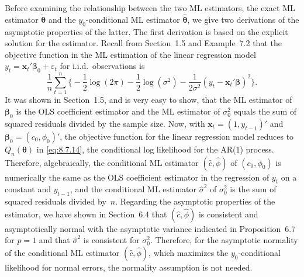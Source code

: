 Before examining the relationship between the two ML estimators, the exact
ML estimator $\tilde{\boldsymbol{\theta}}$ and the $y_0$-conditional ML estimator $\hat{\boldsymbol{\theta}}$, we give two derivations of
the asymptotic properties of the latter. The first derivation is based on the explicit
solution for the estimator. Recall from Section~1.5 and Example~7.2 that the objective function in the ML estimation of the linear regression model $y_t = \mathbf{x}_t'\boldsymbol{\beta}_0 + \varepsilon_t$
for i.i.d.\ observations is
\begin{equation}
  \frac{1}{n}\sum_{t=1}^{n}
    \biggl\{-\frac{1}{2}\log(2\pi) - \frac{1}{2}\log(\sigma^2)
    - \frac{1}{2\sigma^2}(y_t - \mathbf{x}_t'\boldsymbol{\beta})^2\biggr\}.
  \label{eq:8.7.16} \tag{8.7.16}
\end{equation}
It was shown in Section~1.5, and is very easy to show, that the ML estimator of
$\boldsymbol{\beta}_0$ is the OLS coefficient estimator and the ML estimator of $\sigma_0^2$ equals the sum
of squared residuals divided by the sample size. Now, with $\mathbf{x}_t = (1, y_{t-1})'$ and
$\boldsymbol{\beta}_0 = (c_0, \phi_0)'$, the objective function for the linear regression model reduces to
$Q_n(\boldsymbol{\theta})$ in \eqref{eq:8.7.14}, the conditional log likelihood for the AR(1) process. Therefore,
algebraically, the conditional ML estimator $(\hat{c}, \hat{\phi})$ of $(c_0, \phi_0)$ is numerically the
same as the OLS coefficient estimator in the regression of $y_t$ on a constant and $y_{t-1}$,
and the conditional ML estimator $\hat{\sigma}^2$ of $\sigma_0^2$ is the sum of squared residuals divided
by~$n$. Regarding the asymptotic properties of the estimator, we have shown in
Section~6.4 that $(\hat{c}, \hat{\phi})$ is consistent and asymptotically normal with the asymptotic
variance indicated in Proposition~6.7 for $p = 1$ and that $\hat{\sigma}^2$ is consistent for $\sigma_0^2$.
Therefore, for the asymptotic normality of the conditional ML estimator $(\hat{c}, \hat{\phi})$,
which maximizes the $y_0$-conditional likelihood for normal errors, the normality
assumption is not needed.

